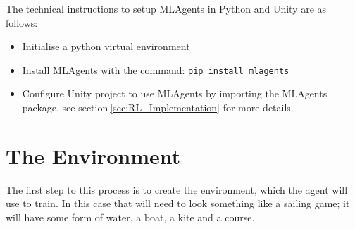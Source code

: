 





The technical instructions to setup MLAgents in Python and Unity are as follows:
\begin{itemize}
    \item Initialise a python virtual environment
    \item Install MLAgents with the command: \texttt{pip install mlagents}
    \item Configure Unity project to use MLAgents by importing the MLAgents package, see section$~$\ref{sec:RL_Implementation} for more details.
\end{itemize}

\section{The Environment}\label{sec:env}

The first step to this process is to create the environment, which the agent will use to train. In this case that will need to look something like a sailing game; it will have some form of water, a boat, a kite and a course. 


